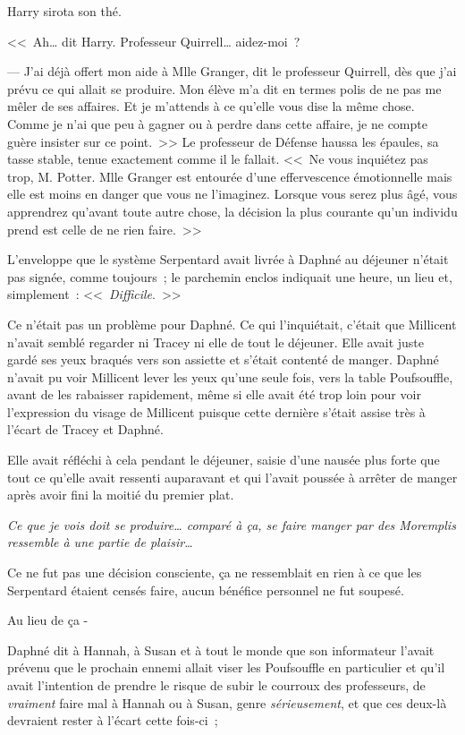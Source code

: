 Harry sirota son thé.

<<~Ah… dit Harry. Professeur Quirrell… aidez-moi~?

--- J'ai déjà offert mon aide à Mlle Granger, dit le professeur Quirrell, dès que j'ai prévu ce qui allait se produire. Mon élève m'a dit en termes polis de ne pas me mêler de ses affaires. Et je m'attends à ce qu'elle vous dise la même chose. Comme je n'ai que peu à gagner ou à perdre dans cette affaire, je ne compte guère insister sur ce point.~>> Le professeur de Défense haussa les épaules, sa tasse stable, tenue exactement comme il le fallait. <<~Ne vous inquiétez pas trop, M. Potter. Mlle Granger est entourée d'une effervescence émotionnelle mais elle est moins en danger que vous ne l'imaginez. Lorsque vous serez plus âgé, vous apprendrez qu'avant toute autre chose, la décision la plus courante qu'un individu prend est celle de ne rien faire.~>>

\later

L'enveloppe que le système Serpentard avait livrée à Daphné au déjeuner n'était pas signée, comme toujours~; le parchemin enclos indiquait une heure, un lieu et, simplement~: <<~\emph{Difficile}.~>>

Ce n'était pas un problème pour Daphné. Ce qui l'inquiétait, c'était que Millicent n'avait semblé regarder ni Tracey ni elle de tout le déjeuner. Elle avait juste gardé ses yeux braqués vers son assiette et s'était contenté de manger. Daphné n'avait pu voir Millicent lever les yeux qu'une seule fois, vers la table Poufsouffle, avant de les rabaisser rapidement, même si elle avait été trop loin pour voir l'expression du visage de Millicent puisque cette dernière s'était assise très à l'écart de Tracey et Daphné.

Elle avait réfléchi à cela pendant le déjeuner, saisie d'une nausée plus forte que tout ce qu'elle avait ressenti auparavant et qui l'avait poussée à arrêter de manger après avoir fini la moitié du premier plat.

\emph{Ce que je vois doit se produire… comparé à ça, se faire manger par des Moremplis ressemble à une partie de plaisir…}

Ce ne fut pas une décision consciente, ça ne ressemblait en rien à ce que les Serpentard étaient censés faire, aucun bénéfice personnel ne fut soupesé.

Au lieu de ça -

Daphné dit à Hannah, à Susan et à tout le monde que son informateur l'avait prévenu que le prochain ennemi allait viser les Poufsouffle en particulier et qu'il avait l'intention de prendre le risque de subir le courroux des professeurs, de \emph{vraiment} faire mal à Hannah ou à Susan, genre \emph{sérieusement}, et que ces deux-là devraient rester à l'écart cette fois-ci~;

